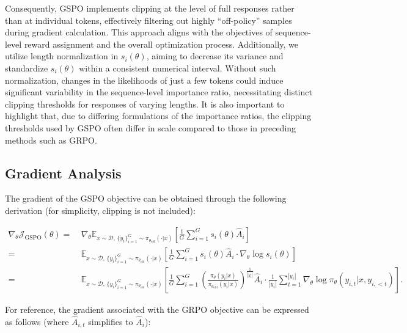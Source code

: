 Consequently, GSPO implements clipping at the level of full responses rather than at individual tokens, effectively filtering out highly ``off-policy'' samples during gradient calculation. This approach aligns with the objectives of sequence-level reward assignment and the overall optimization process. Additionally, we utilize length normalization in $s_{i}(\theta)$, aiming to decrease its variance and standardize $s_{i}(\theta)$ within a consistent numerical interval. Without such normalization, changes in the likelihoods of just a few tokens could induce significant variability in the sequence-level importance ratio, necessitating distinct clipping thresholds for responses of varying lengths. It is also important to highlight that, due to differing formulations of the importance ratios, the clipping thresholds used by GSPO often differ in scale compared to those in preceding methods such as GRPO.

\subsection{Gradient Analysis}
\label{subsec:gradient}

The gradient of the GSPO objective can be obtained through the following derivation (for simplicity, clipping is not included):

\begin{align}
\nabla_{\theta} \mathcal{J}_\text{GSPO} (\theta)
=&\ 
\nabla_{\theta} \mathbb{E}_{ x \sim \mathcal{D},\, \{y_i\}_{i=1}^G \sim \pi_{\theta_\text{old}}( \cdot | x) }
\left[ 
\frac{1}{G} \sum_{i=1}^{G} s_{i}(\theta) \widehat{A}_{i}
\right] \\
= &\ 
\mathbb{E}_{ x \sim \mathcal{D},\, \{y_i\}_{i=1}^G \sim \pi_{\theta_\text{old}}( \cdot | x) }
\left[ 
\frac{1}{G} \sum_{i=1}^{G}
s_{i}(\theta) \widehat{A}_{i}
\cdot \nabla_{\theta} \log s_{i}(\theta)
\right] \\
=&\ 
\mathbb{E}_{ x \sim \mathcal{D},\, \{y_i\}_{i=1}^G \sim \pi_{\theta_\text{old}}( \cdot | x) }
\left[ 
\frac{1}{G} \sum_{i=1}^{G} 
\left( \frac{ \pi_{\theta} (y_i | x) }{ \pi_{\theta_\text{old}} (y_i | x)} \right)^{\frac{1}{|y_i|}} \widehat{A}_{i} 
\cdot \frac{1}{|y_i|} \sum_{t=1}^{|y_i|} \nabla_{\theta} \log \pi_{\theta} (y_{i,t} | x, y_{i,<t}) 
\right].
\label{equ:gspo_grad}
\end{align}

For reference, the gradient associated with the GRPO objective can be expressed as follows (where $\widehat{A}_{i,t}$ simplifies to $\widehat{A}_{i}$):

